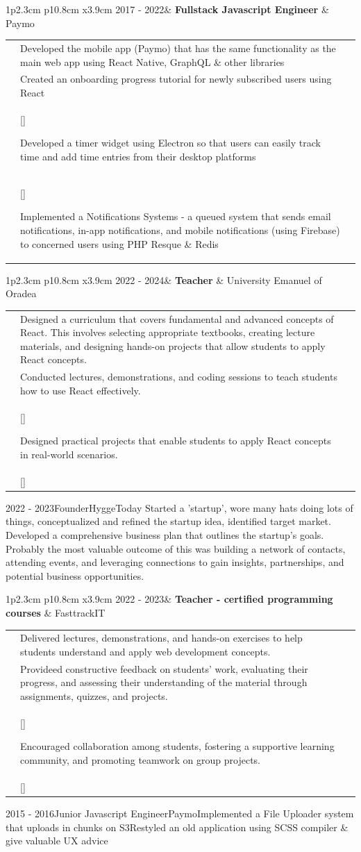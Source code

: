 \documentclass[10pt,A4]{article}
\newcommand\AddAdditional[1]{%
  \StrLen{#1}[\MyStrLen]%
  \ifthenelse{\equal{\MyStrLen}{1}}%
        {}{\larrow{bgcol} #1}}
\newcommand{\tzlarrow}{(0,0) -- (0.2,0) -- (0.3,0.2) -- (0.2,0.4) -- (0,0.4) -- (0.1,0.2) -- cycle;}
\newcommand{\larrow}[1]
{\begin{tikzpicture}[scale=0.58]
	 \filldraw[fill=#1!100,draw=#1!100!black]  \tzlarrow
 \end{tikzpicture}
}
\newcommand{\cvevent}[7]
{
\vspace{14pt}
	\begin{tabular*}{1\textwidth}{p{2.3cm}  p{10.8cm} x{3.9cm}}
 \textcolor{bgcol}{#1}& \textbf{#2} & \vspace{2.5pt}\textcolor{sectcol} {#3}

	\end{tabular*}
\vspace{6pt}
	\begin{tabular*}{1\textwidth}{p{2.3cm} p{10.8cm} p{3.9cm}}
&		 \larrow{bgcol}  #4 & \\[3pt]
&		 \larrow{bgcol}  #5 & \\[6pt]
&		 \AddAdditional{#6} & \\[4pt]
& 		\AddAdditional{#7} &
	\end{tabular*}

}
\begin{document}
%
\cvevent{2017 - 2022}{Fullstack Javascript Engineer}{Paymo}
{Developed the mobile app (Paymo) that has the same functionality as the main web app using React Native, GraphQL \& other libraries}
{Created an onboarding progress tutorial for newly subscribed users using React}
{Developed a timer widget using Electron so that users can easily track time and add time entries from their desktop platforms}
{Implemented a Notifications Systems - a queued system that sends email notifications, in-app notifications, and mobile notifications (using Firebase) to concerned users using PHP Resque \& Redis}

%
\cvevent{2022 - 2024}{Teacher}{University Emanuel of Oradea}
{Designed a curriculum that covers fundamental and advanced concepts of React. This involves selecting appropriate textbooks, creating lecture materials, and designing hands-on projects that allow students to apply React concepts.}
{Conducted lectures, demonstrations, and coding sessions to teach students how to use React effectively.}
{Designed practical projects that enable students to apply React concepts in real-world scenarios.}

%
\cvevent{2022 - 2023}{Founder}{HyggeToday}
{Started a 'startup', wore many hats doing lots of things, conceptualized and refined the startup idea, identified target market.}
{Developed a comprehensive business plan that outlines the startup's goals.}
{Probably the most valuable outcome of this was building a network of contacts, attending events, and leveraging connections to gain insights, partnerships, and potential business opportunities.}

%
\cvevent{2022 - 2023}{Teacher - certified programming courses}{FasttrackIT}
{Delivered lectures, demonstrations, and hands-on exercises to help students understand and apply web development concepts.}
{Provideed constructive feedback on students' work, evaluating their progress, and assessing their understanding of the material through assignments, quizzes, and projects.}
{Encouraged collaboration among students, fostering a supportive learning community, and promoting teamwork on group projects.}


%
\cvevent{2015 - 2016}{Junior Javascript Engineer}{Paymo}{Implemented a File Uploader system that uploads in chunks on S3}{Restyled an old application using SCSS compiler \& give valuable UX advice}

\end{document}
